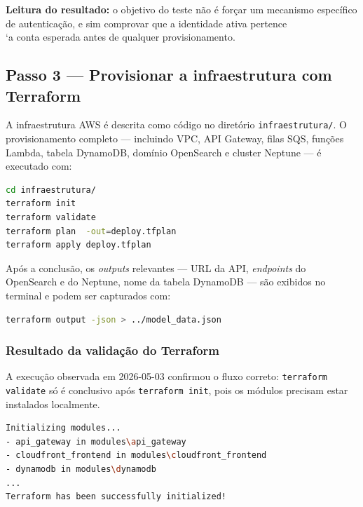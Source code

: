 \noindent\textbf{Leitura do resultado:} o objetivo do teste n\~ao \'e
for\c{c}ar um mecanismo espec\'ifico de autentica\c{c}\~ao, e sim comprovar
que a identidade ativa pertence \\`a conta esperada antes de qualquer
provisionamento.

\subsection{Passo 3 --- Provisionar a infraestrutura com Terraform}

A infraestrutura AWS \'e descrita como c\'odigo no diret\'orio
\texttt{infraestrutura/}. O provisionamento completo --- incluindo
VPC,
API Gateway,
filas SQS,
fun\c{c}\~oes Lambda,
tabela DynamoDB,
dom\'inio OpenSearch e cluster Neptune ---
\'e executado com:

\begin{lstlisting}[language=bash,
  caption={Provisionamento da infraestrutura via Terraform.},
  label={lst:terraform_apply}]
cd infraestrutura/
terraform init
terraform validate
terraform plan  -out=deploy.tfplan
terraform apply deploy.tfplan
\end{lstlisting}

Ap\'os a conclus\~ao, os \textit{outputs} relevantes --- URL da API,
\textit{endpoints} do OpenSearch e do Neptune, nome da tabela DynamoDB
--- s\~ao exibidos no terminal e podem ser capturados com:

\begin{lstlisting}[language=bash,
  caption={Extra\c{c}\~ao de outputs do Terraform.},
  label={lst:terraform_output}]
terraform output -json > ../model_data.json
\end{lstlisting}

\subsubsection*{Resultado da valida\c{c}\~ao do Terraform}

A execu\c{c}\~ao observada em 2026-05-03 confirmou o fluxo correto:
\texttt{terraform validate} s\'o \'e conclusivo ap\'os
\texttt{terraform init}, pois os m\'odulos precisam estar instalados
localmente.

\begin{lstlisting}[language=bash,
      caption={Sa\'ida resumida do \\texttt{terraform init} local.},
      label={lst:cap2_terraform_init_output}]
Initializing modules...
- api_gateway in modules\api_gateway
- cloudfront_frontend in modules\cloudfront_frontend
- dynamodb in modules\dynamodb
...
Terraform has been successfully initialized!
\end{lstlisting}


